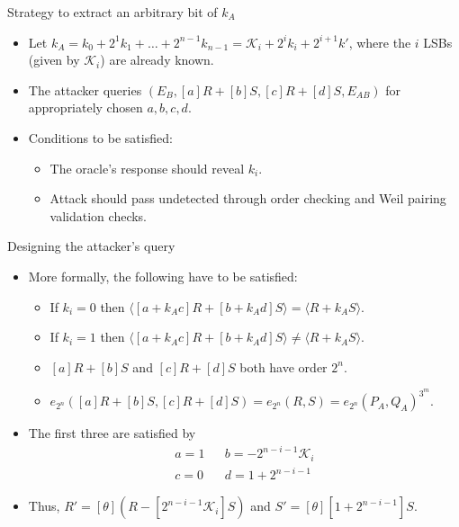 \documentclass{beamer}
\begin{document}
\begin{frame}{Strategy to extract an arbitrary bit of $k_A$}
    \begin{itemize}
        \item Let $k_A = k_0 + 2^1k_1 + \dots + 2^{n-1}k_{n-1} = \mathcal{K}_i + 2^ik_i + 2^{i+1}k'$, where the $i$ LSBs (given by $\mathcal{K}_i$) are already known.
        \item The attacker queries $(E_B, [a]R+[b]S, [c]R+[d]S, E_{AB})$ for appropriately chosen $a,b,c,d$.
        \item Conditions to be satisfied:
        \begin{itemize}
            \item The oracle's response should reveal $k_i$.
            \item Attack should pass undetected through order checking and Weil pairing validation checks.
        \end{itemize}
    \end{itemize}
\end{frame}

\begin{frame}{Designing the attacker's query}
    \begin{itemize}
        \item More formally, the following have to be satisfied:
        \begin{itemize}
            \item If $k_i=0$ then $\langle [a+k_A c]R + [b+k_A d]S\rangle = \langle R + k_A S\rangle$.
            \item If $k_i=1$ then $\langle [a+k_A c]R + [b+k_A d]S\rangle \neq \langle R + k_A S\rangle$.
            \item $[a]R+[b]S$ and $[c]R+[d]S$ both have order $2^n$.
            \item $e_{2^n}([a]R+[b]S, [c]R+[d]S) = e_{2^n}(R,S) = e_{2^n}(P_A,Q_A)^{3^m}$.
        \end{itemize}
        \item The first three are satisfied by
        \begin{align*}
            a = 1 && b = -2^{n-i-1}\mathcal{K}_i\\
            c = 0 && d = 1 + 2^{n-i-1}
        \end{align*}
        \item Thus, $R' = [\theta](R - [2^{n-i-1}\mathcal{K}_i]S)$ and $S' = [\theta][1+2^{n-i-1}]S$.        
    \end{itemize}
\end{frame}
\end{document}
